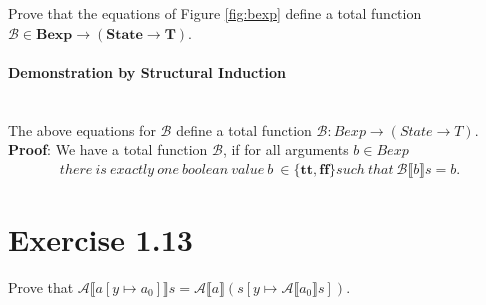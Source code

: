 \documentclass{article}
\begin{document}
Prove that the equations of Figure \ref{fig:bexp} define a total function $\mathcal{B} \in \textbf{Bexp} \rightarrow
(\textbf{State} \rightarrow \textbf{T})$.

\paragraph{Demonstration by Structural Induction}\mbox{} \\


The above equations for $\mathcal{B}$ define a total function $\mathcal{B}: Bexp \rightarrow (State \rightarrow T)$. \\

\noindent \textbf{Proof}: We have a total function $\mathcal B$, if for all arguments $b \in Bexp$
\begin{equation}
\tag{*}
\begin{split}
there\ is\ exactly\ one\ boolean\ value\ b\ \in \{ \textbf{tt}, \textbf{ff} \} such\ that\ \mathcal{B} \llbracket b \rrbracket s = b.
\end{split}
\end{equation}

\section{Exercise 1.13}

Prove that $ \mathcal{A} \llbracket a [ y \mapsto a_0 ] \rrbracket s = \mathcal{A} \llbracket a \rrbracket ( s [ y \mapsto \mathcal{A} \llbracket a_0 \rrbracket s ]) $.
\end{document}
